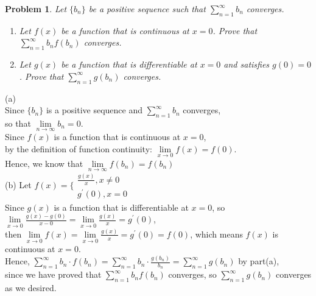\documentclass[12pt,reqno]{amsart}
\newtheorem{problem}{Problem}
\begin{document}
\medskip
\begin{problem}
Let $\{b_n\}$ be a positive sequence such that $\sum_{n=1}^\infty b_n$ converges.
\begin{enumerate}
\item Let $f(x)$ be a function that is continuous at $x=0$. Prove that $\sum_{n=1}^\infty b_n f(b_n)$ converges.
\item Let $g(x)$ be a function that is differentiable at $x=0$ and satisfies $g(0)=0$. Prove that $\sum_{n=1}^\infty g(b_n)$ converges.
\end{enumerate}
\end{problem}
(a)
\\Since $\{b_n\}$ is a positive sequence and  $\sum_{n=1}^\infty b_n$ converges,
\\so that $\lim\limits _{n \rightarrow \infty} b_n=0$.
\\Since $f(x)$ is a function that is continuous at $x=0$,
\\by the definition of function continuity: $\lim\limits_{x\to 0}f(x)=f(0).$
\\Hence, we know that $\lim\limits_ {n\to \infty}f(b_n)=f(b_n)$
\\(b)
Let $f(x)=\{\begin{array}{l}
	\frac{g(x)}{x}, x \neq 0  \\
	g^{\prime}(0), x=0
   \end{array}$ 
\\Since $g(x)$ is a function that is differentiable at $x=0$,
so $\lim\limits _{x \rightarrow 0} \frac{g(x)-g(0)}{x-0}=\lim\limits _{x \rightarrow 0} \frac{g(x)}{x}=g^{\prime}(0)$, \\
then $\lim\limits _{x \rightarrow 0} f(x)=\lim\limits _{x \rightarrow 0} \frac{g(x)}{x}=g^{\prime}(0)=f(0)$, which means $f(x)$ is continuous at $x=0$. \\
Hence, $\sum_{n=1}^{\infty} b_n \cdot f(b_n)=\sum_{n=1}^{\infty} b_n \cdot \frac{g(b_n)}{b_n}=\sum_{n=1}^{\infty} g(b_n)$ by part(a),
\\since we have proved that $\sum_{n=1}^\infty b_n f(b_n)$ converges, so $\sum_{n=1}^\infty g(b_n)$ converges as we desired.
\end{document}
